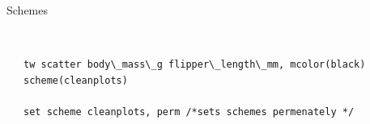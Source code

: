 \documentclass[shownotes,12pt, aspectratio=169]{beamer}
\begin{document}
\begin{frame}[t]{Schemes}
  \begin{columns}
  \begin{column}[T]{.5\textwidth}
    \begin{center}
  \end{center}
  \end{column}
  \hfill
  \begin{column}[T]{.5\textwidth}
  \begin{verbatim}

tw scatter body\_mass\_g flipper\_length\_mm, mcolor(black) scheme(cleanplots)

set scheme cleanplots, perm /*sets schemes permenately */
  \end{verbatim}
  \end{column}
  \end{columns}


\end{frame}
\end{document}
